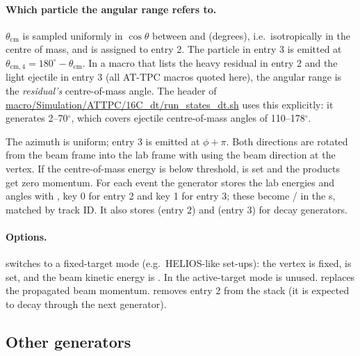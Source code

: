 \paragraph{Which particle the angular range refers to.} $\theta_\mathrm{cm}$ is sampled uniformly in
$\cos\theta$ between  and  (degrees), i.e.\ isotropically in the
centre of mass, and is assigned to entry 2. The particle in entry 3 is emitted at
$\theta_\mathrm{cm,4} = 180^\circ - \theta_\mathrm{cm}$. In a macro that lists the heavy residual in
entry 2 and the light ejectile in entry 3 (all AT-TPC macros quoted here), the angular range is the
\emph{residual's} centre-of-mass angle. The header of
\url{macro/Simulation/ATTPC/16C_dt/run_states_dt.sh} uses this explicitly: it generates 2--70$^\circ$,
which covers ejectile centre-of-mass angles of 110--178$^\circ$.

The azimuth is uniform; entry 3 is emitted at $\phi+\pi$. Both directions are rotated from the beam
frame into the lab frame with  using the beam direction at the vertex.
If the centre-of-mass energy is below threshold,  is set and the products
get zero momentum. For each event the generator stores the lab energies and angles with
, key 0 for entry 2 and key 1 for entry 3; these become
/ in the s, matched by track ID. It also stores
 (entry 2) and  (entry 3) for decay generators.

\paragraph{Options.}  switches to a fixed-target mode
(e.g.\ HELIOS-like set-ups): the vertex is fixed,  is set, and the beam kinetic
energy is . In the active-target mode  is unused.
 replaces the propagated beam momentum.
 removes entry 2 from the stack (it is expected to decay through the
next generator).

\subsection{Other generators}

